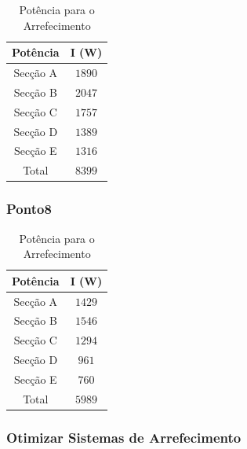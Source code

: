 \documentclass[12pt, a4paper]{article}
\begin{document}
\begin{table}[htpb]
	\begin{center}
		\begin{tabular}{c c}
			\toprule
			Potência 								 & 	I (W) \\
			\midrule
			Secção A 						               	     & $1890$	 \\
			Secção B						               	     & $2047$	 \\
			Secção C						               	     & $1757$	 \\
			Secção D 						               	 & $1389$	 \\
			Secção E						               	  	 & $1316$	 \\
			\hline
			Total						             & $8399$	 \\
			\bottomrule
		\end{tabular}
	\end{center}
	\caption{Potência para o Arrefecimento}\label{tab:arrefecimento28P7}
\end{table}

\pagebreak
\subsubsection{Ponto8}

\begin{table}[htpb]
	\begin{center}
		\begin{tabular}{c c}
			\toprule
			Potência 								 & 	I (W) \\
			\midrule
			Secção A 						               	     & $1429$	 \\
			Secção B						               	     & $1546$	 \\
			Secção C						               	     & $1294$	 \\
			Secção D 						               	 & $961$	 \\
			Secção E						               	  	 & $760$	 \\
			\hline
			Total						             & $5989$	 \\
			\bottomrule
		\end{tabular}
	\end{center}
	\caption{Potência para o Arrefecimento}\label{tab:arrefecimentoP8}
\end{table}

\subsubsection{Otimizar Sistemas de Arrefecimento}
\end{document}
